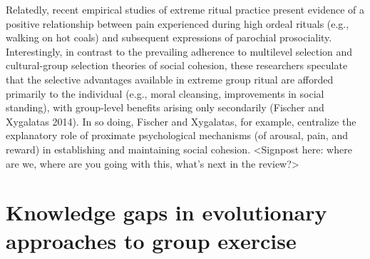 Relatedly, recent empirical studies of extreme ritual practice present evidence of a positive relationship between pain experienced during high ordeal rituals (e.g., walking on hot coals) and subsequent expressions of parochial prosociality. Interestingly, in contrast to the prevailing adherence to multilevel selection and cultural-group selection theories of social cohesion, these researchers speculate that the selective advantages available in extreme group ritual are afforded primarily to the individual (e.g., moral cleansing, improvements in social standing), with group-level benefits arising only secondarily (Fischer and Xygalatas 2014). In so doing, Fischer and Xygalatas, for example, centralize the explanatory role of proximate psychological mechanisms (of arousal, pain, and reward) in establishing and maintaining social cohesion.
<Signpost here: where are we, where are you going with this, what’s next in the review?>




\section{Knowledge gaps in evolutionary approaches to group exercise}

